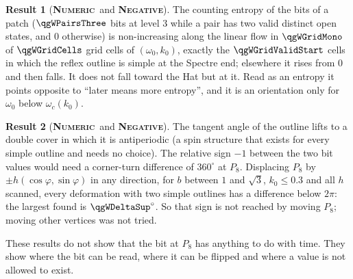 \documentclass[11pt]{article}
\newcommand{\numeric}{\textbf{\textsc{Numeric}}}
\newcommand{\negres}{\textbf{\textsc{Negative}}}
\theoremstyle{definition}
\newtheorem{result}{Result}
\begin{document}
\begin{result}[\numeric\ and \negres]\label{res:flow-entropy}
The counting entropy of the bits of a patch ($\qgWPairsThree$ bits at level $3$ while a pair has two valid distinct open states, and $0$ otherwise) is non-increasing along the linear flow in $\qgWGridMono$ of $\qgWGridCells$ grid cells of $(\omega_0,k_0)$, exactly the $\qgWGridValidStart$ cells in which the reflex outline is simple at the Spectre end; elsewhere it rises from $0$ and then falls. It does not fall toward the Hat but at it. Read as an entropy it points opposite to ``later means more entropy'', and it is an orientation only for $\omega_0$ below $\omega_c(k_0)$.
\end{result}
\begin{result}[\numeric\ and \negres]\label{res:flow-sign}
The tangent angle of the outline lifts to a double cover in which it is antiperiodic (a spin structure that exists for every simple outline and needs no choice). The relative sign $-1$ between the two bit values would need a corner-turn difference of $360^\circ$ at $P_8$. Displacing $P_8$ by $\pm h(\cos\varphi,\sin\varphi)$ in any direction, for $b$ between $1$ and $\sqrt3$, $k_0\le0.3$ and all $h$ scanned, every deformation with two simple outlines has a difference below $2\pi$: the largest found is $\qgWDeltaSup^\circ$. So that sign is not reached by moving $P_8$; moving other vertices was not tried.
\end{result}
These results do not show that the bit at $P_8$ has anything to do with time. They show where the bit can be read, where it can be flipped and where a value is not allowed to exist.

\end{document}
